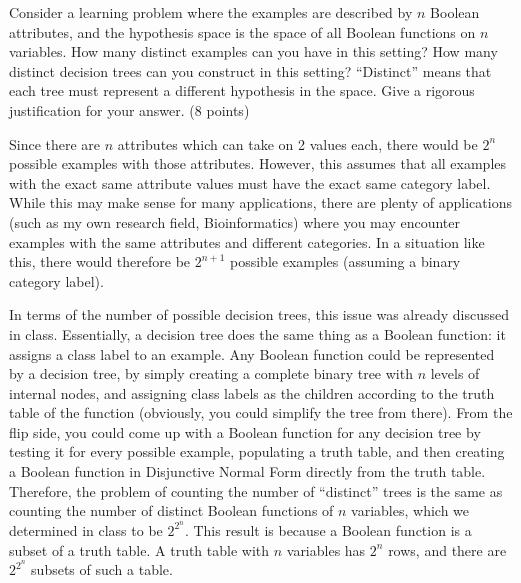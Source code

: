 \documentclass[fleqn]{homework}
\begin{document}
  \begin{problem}{4}
    \begin{question}
      Consider a learning problem where the examples are described by $n$
      Boolean attributes, and the hypothesis space is the space of all Boolean
      functions on $n$ variables.  How many distinct examples can you have in
      this setting?  How many distinct decision trees can you construct in this
      setting?  ``Distinct'' means that each tree must represent a different
      hypothesis in the space.  Give a rigorous justification for your
      answer. (8 points)
    \end{question}

    Since there are $n$ attributes which can take on 2 values each, there would
    be $2^n$ possible examples with those attributes.  However, this assumes
    that all examples with the exact same attribute values must have the exact
    same category label.  While this may make sense for many applications, there
    are plenty of applications (such as my own research field, Bioinformatics)
    where you may encounter examples with the same attributes and different
    categories.  In a situation like this, there would therefore be $2^{n+1}$
    possible examples (assuming a binary category label).

    In terms of the number of possible decision trees, this issue was already
    discussed in class.  Essentially, a decision tree does the same thing as a
    Boolean function: it assigns a class label to an example.  Any Boolean
    function could be represented by a decision tree, by simply creating a
    complete binary tree with $n$ levels of internal nodes, and assigning class
    labels as the children according to the truth table of the function
    (obviously, you could simplify the tree from there).  From the flip side,
    you could come up with a Boolean function for any decision tree by testing
    it for every possible example, populating a truth table, and then creating a
    Boolean function in Disjunctive Normal Form directly from the truth table.
    Therefore, the problem of counting the number of ``distinct'' trees is the
    same as counting the number of distinct Boolean functions of $n$ variables,
    which we determined in class to be $2^{2^n}$.  This result is because a
    Boolean function is a subset of a truth table.  A truth table with $n$
    variables has $2^n$ rows, and there are $2^{2^n}$ subsets of such a table.
  \end{problem}
\end{document}
